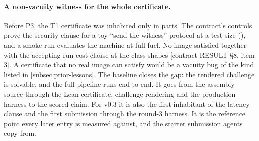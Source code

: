 \paragraph{A non-vacuity witness for the whole certificate.} Before P3, the T1 certificate was
inhabited only in parts. The contract's controls prove the security clause for a toy ``send the
witness'' protocol at a test size (), and a smoke run evaluates the machine at full
fuel. No image satisfied  together with the accepting-run cost clause at the class shapes
[contract RESULT §8, item 3]. A certificate that no real image can satisfy would be a vacuity bug of
the kind listed in \cref{subsec:prior-lessons}. The baseline closes the gap: the rendered challenge
is solvable, and the full pipeline runs end to end. It goes from the assembly source through the Lean
certificate, challenge rendering and the production harness to the scored claim. For v0.3 it is also
the first inhabitant of the latency clause and the first submission through the round-3 harness. It
is the reference point every later entry is measured against, and the starter submission agents copy
from.

